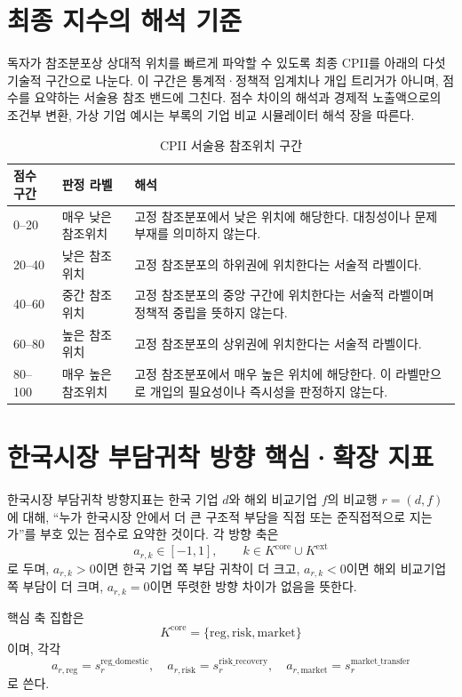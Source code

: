 \documentclass[11pt,a4paper]{report}
\begin{document}
\section{최종 지수의 해석 기준}
독자가 참조분포상 상대적 위치를 빠르게 파악할 수 있도록 최종 CPII를 아래의 다섯 기술적 구간으로 나눈다. 이 구간은 통계적·정책적 임계치나 개입 트리거가 아니며, 점수를 요약하는 서술용 참조 밴드에 그친다. 점수 차이의 해석과 경제적 노출액으로의 조건부 변환, 가상 기업 예시는 부록의 기업 비교 시뮬레이터 해석 장을 따른다.
\begin{table}[H]
  \centering
  \small
  \caption{CPII 서술용 참조위치 구간}\label{tab:cpii_interpretation_bands}
  \begin{tabular}{p{2.2cm}p{2.4cm}p{8.0cm}}
    \toprule
    \rowcolor{ReportTableHead}
    점수 구간 & 판정 라벨 & 해석 \\
    \midrule
    0--20 & 매우 낮은 참조위치 & 고정 참조분포에서 낮은 위치에 해당한다. 대칭성이나 문제 부재를 의미하지 않는다. \\
    20--40 & 낮은 참조위치 & 고정 참조분포의 하위권에 위치한다는 서술적 라벨이다. \\
    40--60 & 중간 참조위치 & 고정 참조분포의 중앙 구간에 위치한다는 서술적 라벨이며 정책적 중립을 뜻하지 않는다. \\
    60--80 & 높은 참조위치 & 고정 참조분포의 상위권에 위치한다는 서술적 라벨이다. \\
    80--100 & 매우 높은 참조위치 & 고정 참조분포에서 매우 높은 위치에 해당한다. 이 라벨만으로 개입의 필요성이나 즉시성을 판정하지 않는다. \\
    \bottomrule
  \end{tabular}
\end{table}

\section{한국시장 부담귀착 방향 핵심·확장 지표}\label{sec:signed_definition}
한국시장 부담귀착 방향지표는 한국 기업 \(d\)와 해외 비교기업 \(f\)의 비교행 \(r=(d,f)\)에 대해, ``누가 한국시장 안에서 더 큰 구조적 부담을 직접 또는 준직접적으로 지는가''를 부호 있는 점수로 요약한 것이다. 각 방향 축은
\[
a_{r,k}\in[-1,1],
\qquad
k \in K^{\mathrm{core}} \cup K^{\mathrm{ext}}
\]
로 두며, \(a_{r,k}>0\)이면 한국 기업 쪽 부담 귀착이 더 크고, \(a_{r,k}<0\)이면 해외 비교기업 쪽 부담이 더 크며, \(a_{r,k}=0\)이면 뚜렷한 방향 차이가 없음을 뜻한다.

핵심 축 집합은
\[
K^{\mathrm{core}}
=
\{\mathrm{reg},\mathrm{risk},\mathrm{market}\}
\]
이며, 각각
\[
a_{r,\mathrm{reg}}=s^{\mathrm{reg\_domestic}}_r,\quad
a_{r,\mathrm{risk}}=s^{\mathrm{risk\_recovery}}_r,\quad
a_{r,\mathrm{market}}=s^{\mathrm{market\_transfer}}_r
\]
로 쓴다.
\end{document}
